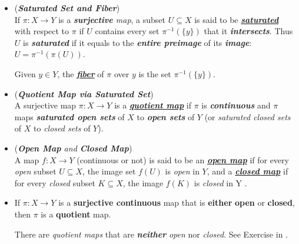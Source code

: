 \documentclass[11pt]{article}
\begin{document}
\begin{itemize}
\item \begin{definition} (\emph{\textbf{Saturated Set and Fiber}})\\
If $\pi: X \rightarrow Y$ is a \emph{\textbf{surjective} map}, a subset $U \subseteq X$ is said to be \underline{\emph{\textbf{saturated}}} with respect to $\pi$ if $U$ contains every set $\pi^{-1}(\{y\})$ that it \emph{\textbf{intersects}}. Thus $U$ is \emph{\textbf{saturated}} if it equals to the \textbf{\emph{entire preimage}} of its \emph{\textbf{image}}: $U =\pi^{-1}(\pi(U))$. 

Given $y \in Y$, the \underline{\emph{\textbf{fiber}}} of $\pi$ over $y$ is the set $\pi^{-1}(\{y\})$. 
\end{definition}

\item \begin{definition} (\emph{\textbf{Quotient Map via Saturated Set}})\\
A surjective map $\pi : X \rightarrow Y$ is a \underline{\emph{\textbf{quotient map}}} if $\pi$ is \emph{\textbf{continuous}} and $\pi$ maps \emph{\textbf{saturated open sets}} of $X$ to \emph{\textbf{open sets}} of $Y$ (or \emph{saturated closed sets} of $X$ to \emph{closed sets} of $Y$).
\end{definition}


\item \begin{definition} (\emph{\textbf{Open Map} and \textbf{Closed Map}})\\
A map $f: X \rightarrow Y$ (continuous or not) is said to be an \underline{\emph{\textbf{open map}}} if for every \emph{open} subset $U \subseteq X$, the image set $f(U)$ is \emph{open} in $Y$, and a  \underline{\emph{\textbf{closed map}}} if for every \emph{closed} subset $K \subseteq X$, the image $f(K)$ is \emph{closed} in Y . 
\end{definition}


\item \begin{proposition}
If $\pi: X \rightarrow Y$ is a \textbf{surjective continuous} map that is \textbf{either} \textbf{open} or \textbf{closed}, then $\pi$ is a \textbf{quotient} map.
\end{proposition}
\begin{remark}
There are \emph{quotient maps} that are \emph{\textbf{neither}} \emph{open} nor \emph{closed}. See Exercise in \citep{munkres2000topology}.
\end{remark}


\end{itemize}
\end{document}
